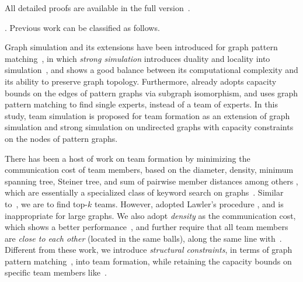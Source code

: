 All detailed proofs are available  in the full version~\cite{fullvldb18}.

. Previous work can be classified as follows.


 Graph simulation \cite{infsimu95} and its extensions have been introduced for graph pattern matching~\cite{FanLMTWW10,MaCFHW14,Guanfeng15,FanCount16}, in which {\em strong simulation} introduces duality and locality into simulation~\cite{MaCFHW14}, and shows a good balance between its computational complexity and its ability to preserve graph topology. Furthermore, \cite{FanCount16} already adopts capacity bounds on the edges of pattern graphs via subgraph isomorphism, and \cite{FanWWXin13} uses graph pattern matching to find single experts, instead of a team of experts. In this study, team simulation is proposed for team formation as an extension of graph simulation and strong simulation on undirected graphs with capacity constraints on the nodes of pattern graphs.



There has been a host of work on team formation by minimizing the communication cost of team members, based on the diameter, density, minimum spanning tree, Steiner tree, and sum of pairwise member distances among others \cite{Lappas09,Kargar11,ArisLuca12,GajewarS12,realTeamForm13,SamikKVM12,LiTongCao15}, which are essentially  a specialized class of keyword search on graphs~\cite{Aggarwal10}. Similar to~\cite{Kargar11}, we are to find top-$k$ teams. However, \cite{Kargar11} adopted Lawler's procedure \cite{Lawler1972}, and is inappropriate for large graphs. We also adopt {\em density}  as the communication cost, which shows a better performance~\cite{GajewarS12}, and further require that all team members are {\em close to each other} (located in the same balls), along the same line with~\cite{Lappas09,Kargar11,ArisLuca12,SamikKVM12}. 
Different from these work, we introduce {\em structural constraints}, in terms of graph pattern matching~\cite{FanLMTWW10,MaCFHW14}, into team formation, while retaining the capacity bounds on specific team members like~\cite{realTeamForm13,GajewarS12}.




